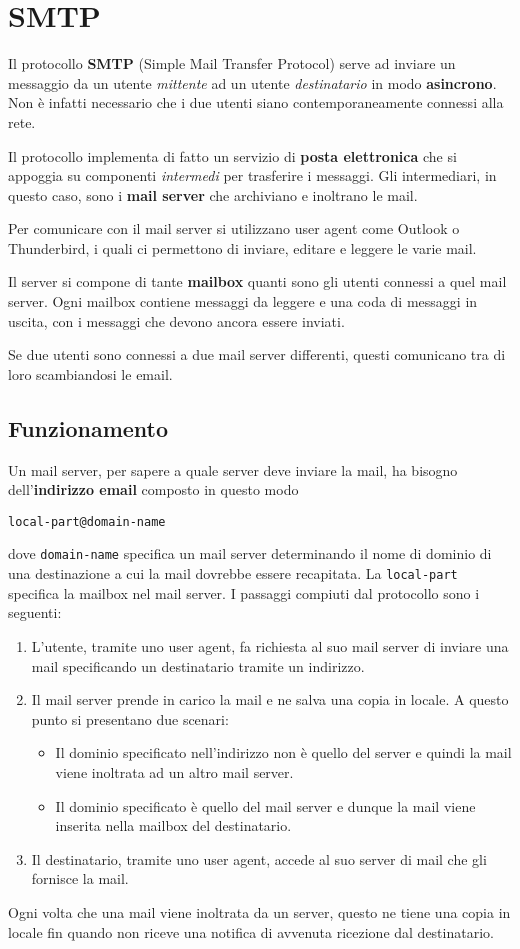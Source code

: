 \section{SMTP}
Il protocollo \textbf{SMTP} (Simple Mail Transfer Protocol) serve ad 
inviare un messaggio da un utente \emph{mittente} ad un utente 
\emph{destinatario} in modo \textbf{asincrono}. Non è infatti 
necessario che i due utenti siano contemporaneamente connessi alla 
rete.

Il protocollo implementa di fatto un servizio di \textbf{posta
elettronica} che si appoggia su componenti \emph{intermedi} per 
trasferire i messaggi. Gli intermediari, in questo caso, sono i
\textbf{mail server} che archiviano e inoltrano le mail.

Per comunicare con il mail server si utilizzano user agent come Outlook
o Thunderbird, i quali ci permettono di inviare, editare e leggere le 
varie mail.

Il server si compone di tante \textbf{mailbox} quanti sono gli utenti 
connessi a quel mail server. Ogni mailbox contiene messaggi da leggere 
e una coda di messaggi in uscita, con i messaggi che devono ancora
essere inviati.

Se due utenti sono connessi a due mail server differenti, questi 
comunicano tra di loro scambiandosi le email.

\subsection{Funzionamento}
Un mail server, per sapere a quale server deve inviare la mail, ha 
bisogno dell'\textbf{indirizzo email} composto in questo modo
\begin{center}
	\verb|local-part@domain-name|
\end{center}
dove \verb|domain-name| specifica un mail server determinando il nome 
di dominio di una destinazione a cui la mail dovrebbe essere 
recapitata. La \verb|local-part| specifica la mailbox nel mail server. 
I passaggi compiuti dal protocollo sono i seguenti:
\begin{enumerate}
	\item L'utente, tramite uno user agent, fa richiesta al suo 
		mail server di inviare una mail specificando un destinatario 
		tramite un indirizzo.
	\item Il mail server prende in carico la mail e ne salva una copia 
		in locale. A questo punto si presentano due scenari:
		\begin{itemize}
			\item Il dominio specificato nell'indirizzo non è quello 
				del server e quindi la mail viene inoltrata ad un altro
				mail server.
			\item Il dominio specificato è quello del mail server e 
				dunque la mail viene inserita nella mailbox del 
				destinatario.
		\end{itemize}
	\item Il destinatario, tramite uno user agent, accede al suo server
		di mail che gli fornisce la mail.
\end{enumerate}
Ogni volta che una mail viene inoltrata da un server, questo ne tiene 
una copia in locale fin quando non riceve una notifica di avvenuta 
ricezione dal destinatario.

